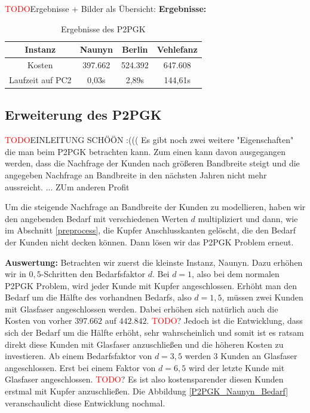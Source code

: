 \documentclass[11pt,a4paper]{article}
\newcommand{\TODO}{\textcolor{red}{TODO}}
\theoremstyle{my_th_style1}
\begin{document}
\TODO Ergebnisse + Bilder als Übersicht:
\textbf{Ergebnisse:} 
\begin{table}[h]
	\centering
	\begin{tabular}{c|c|c|c}
		Instanz & Naunyn & Berlin & Vehlefanz \\	
		\hline
		Kosten & 397.662 & 524.392 & 647.608 \\
		Laufzeit auf PC2 & 0,03s & 2,89s & 144,61s \\
	\end{tabular}
	\label{P2PGK}
	\caption{Ergebnisse des P2PGK} 
\end{table}

\subsection{Erweiterung des P2PGK}
\TODO EINLEITUNG SCHÖÖN :(((
Es gibt noch zwei weitere "Eigenschaften" die man beim P2PGK betrachten kann. Zum einen kann davon ausgegangen werden, dass die Nachfrage der Kunden nach größeren Bandbreite steigt und die angegeben Nachfrage an Bandbreite in den nächsten Jahren nicht mehr aussreicht. ... ZUm anderen Profit

Um die steigende Nachfrage an Bandbreite der Kunden zu modellieren, haben wir den angebenden Bedarf mit verschiedenen Werten $d$ multipliziert und dann, wie im Abschnitt \ref{preprocess}, die Kupfer Anschlusskanten gelöscht, die den Bedarf der Kunden nicht decken können. Dann lösen wir das P2PGK Problem erneut. 

\textbf{Auswertung:}
Betrachten wir zuerst die kleinste Instanz, Naunyn. Dazu erhöhen wir in $0,5$-Schritten den Bedarfsfaktor $d$. Bei $d=1$, also bei dem normalen P2PGK Problem, wird jeder Kunde mit Kupfer angeschlossen. Erhöht man den Bedarf um die Hälfte des vorhandnen Bedarfs, also $d=1,5$, müssen zwei Kunden mit Glasfaser angeschlossen werden. Dabei erhöhen sich natürlich auch die Kosten von vorher $397.662$ auf $442.842$.
\TODO? Jedoch ist die Entwicklung, dass sich der Bedarf um die Hälfte erhöht, sehr wahrscheinlich und somit ist es ratsam direkt diese Kunden mit Glasfaser anzuschließen und die höheren Kosten zu investieren.
Ab einem Bedarfsfaktor von $d=3,5$ werden 3 Kunden an Glasfaser angeschlossen. Erst bei einem Faktor von $d=6,5$ wird der letzte Kunde mit Glasfaser angeschlossen. 
\TODO? Es ist also kostensparender diesen Kunden erstmal mit Kupfer anzuschließen. Die Abbildung \ref{P2PGK_Naunyn_Bedarf} veranschaulicht diese Entwicklung nochmal.
\end{document}

